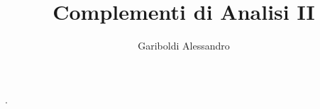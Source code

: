 \documentclass[a4paper, oneside]{article}
\title{Complementi di Analisi II}
\author{Gariboldi Alessandro}
\date{ }
\begin{document}
                {}          %
                {}          %
                {\slshape}  %
                {}          %
                {\bfseries} %
                {.}         %
                {\newline}         %
                {}          %
\theoremstyle{theoremEnv}

\newtheorem{definition}{Definizione}[section]
\newtheorem{theorem}{Teorema}[section]
\newtheorem{lemma}{Lemma}[section]
\newtheorem{observation}{Oss.}[section]
\newtheorem{corollary}{Corollario}[theorem]
\newtheorem{example}{Esempio}[section]
\newtheorem{problem}{Problema}[section]
\newtheorem{solution}{Soluzione}[section]
\newtheorem{proposition}{Proposizione}[section]
\maketitle
\end{document}
